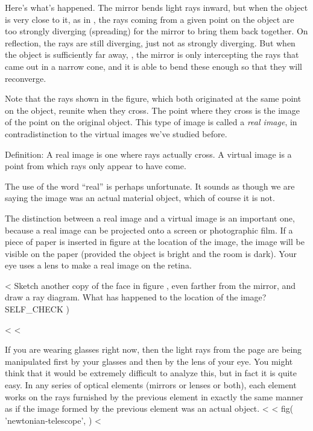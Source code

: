 Here's what's happened. The mirror bends light rays inward,
but when the object is very close to it, as in , the rays
coming from a given point on the object are too strongly
diverging (spreading) for the mirror to bring them back
together. On reflection, the rays are still diverging, just
not as strongly diverging. But when the object is sufficiently
far away, , the mirror is only intercepting the rays that
came out in a narrow cone, and it is able to bend these
enough so that they will reconverge.

Note that the rays shown in the figure, which both
originated at the same point on the object, reunite when
they cross. The point where they cross is the image of the
point on the original object. This type of image is called a
\emph{real image}, in contradistinction to the virtual
images we've studied before. 

\begin{important}
Definition: A real image is one where rays actually cross.
A virtual image is a point from which rays only appear to have come.
\end{important}

The use of the word ``real'' is
perhaps unfortunate. It sounds as though we are saying the
image was an actual material object, which of course it is not.

The distinction between a real image and a virtual image is
an important one, because a real image can be projected onto a
screen or photographic film. If a piece of paper is inserted
in figure  at the location of the image, the image will
be visible on the paper (provided the object is bright and
the room is dark). Your eye uses a lens to make a real image
on the retina.

<%
Sketch another copy of the face in figure , even farther
from the mirror, and draw a ray diagram. What has happened
to the location of the image?
  SELF_CHECK
  ) %

<%
<%

If you are wearing glasses right now, then the light rays
from the page are being manipulated first by your glasses
and then by the lens of your eye. You might think that it
would be extremely difficult to analyze        this, but in fact it
is quite easy. In any series of optical elements (mirrors or
lenses or both), each element works on the rays furnished by
the previous element in exactly the same manner as if the
image formed by the previous element was an actual object.
<%
<%
  fig(
    'newtonian-telescope',
  )
<%

